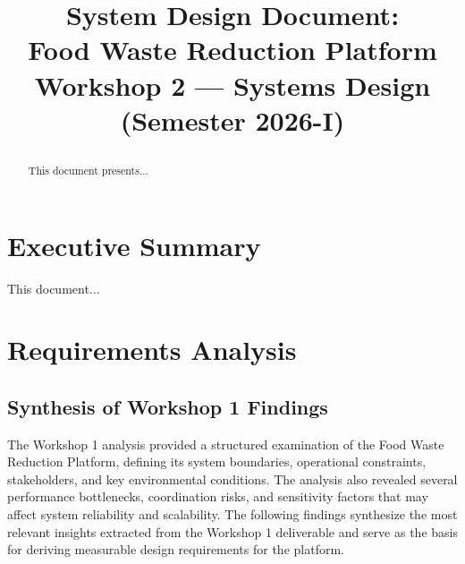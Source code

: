 \documentclass[conference]{IEEEtran}
\title{%
  \fontsize{24}{28}\selectfont\bfseries
  \parbox{0.9\textwidth}{\centering
    System Design Document:\\
    Food Waste Reduction Platform\\
    \vspace{0.2cm}
    \large Workshop 2 — Systems Design (Semester 2026-I)
  }%
}
\author{
  \IEEEauthorblockN{\textbf{Luna Alejandra Sandoval Rodriguez}}
  \IEEEauthorblockA{20241020053 \\
                    \textit{Systems Analyst / Project Lead}}
  \and
  \IEEEauthorblockN{\textbf{Cristian Camilo Bonilla Lizarazo}}
  \IEEEauthorblockA{20241020015 \\
                    \textit{Systems Analyst / Frontend Developer}}
  \linebreakand
  \IEEEauthorblockN{\textbf{Nicolas Rodriguez Granados}}
  \IEEEauthorblockA{2024102037 \\
                    \textit{Systems Analyst / Backend Developer}}
  \and
  \IEEEauthorblockN{\textbf{Juan Sebastian Bravo Rojas}}
  \IEEEauthorblockA{20241020004 \\
                    \textit{Systems Analyst / Database Specialist}}
}
\begin{document}
\maketitle

\begin{abstract}
This document presents...
\end{abstract}

\section{Executive Summary}

This document...

\section{Requirements Analysis}

\subsection{Synthesis of Workshop 1 Findings}

The Workshop 1 analysis provided a structured examination of the Food Waste Reduction Platform, defining its system boundaries, operational constraints, stakeholders, and key environmental conditions. The analysis also revealed several performance bottlenecks, coordination risks, and sensitivity factors that may affect system reliability and scalability. The following findings synthesize the most relevant insights extracted from the Workshop 1 deliverable and serve as the basis for deriving measurable design requirements for the platform.
\end{document}
